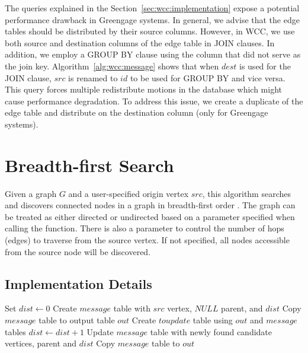 The queries explained in the Section~\ref{sec:wcc:implementation} expose a
potential performance drawback in Greengage systems. In general, we advise
that the edge tables should be distributed by their source columns. However,
in WCC, we use both source and destination columns of the edge table in JOIN
clauses. In addition, we employ a GROUP BY clause using the column that did
not serve as the join key. Algorithm~\ref{alg:wcc:message} shows that when $dest$
is used for the JOIN clause, $src$ is renamed to $id$ to be used for GROUP BY
and vice versa. This query forces multiple redistribute motions in the
database which might cause performance degradation. To address this issue, we
create a duplicate of the edge table and distribute on the destination column
(only for Greengage systems).

\section{Breadth-first Search} \label{sec:graph:bfs}

Given a graph $G$ and a user-specified origin vertex $src$, this algorithm
searches and discovers connected nodes in a graph in breadth-first order
\cite{bfs_wikipedia}. The graph can be treated as either directed or
undirected based on a parameter specified when calling the function.
There is also a parameter to control the number of hops (edges) to traverse
from the source vertex. If not specified, all nodes accessible from the
source node will be discovered.

\subsection{Implementation Details}
\begin{algorithm} \label{alg:bfs:high}
\begin{algorithmic}[1]
    \State Set $dist \leftarrow 0$
    \State Create $message$ table with $src$ vertex, $NULL$ parent, and $dist$
    \State Copy $message$ table to output table $out$
    \Repeat
        \State Create $toupdate$ table using $out$ and $message$ tables
        \State $dist \leftarrow dist + 1$
        \State Update $message$ table with newly found candidate vertices, parent and $dist$
        \State Copy $message$ table to $out$
\end{algorithmic}
\end{algorithm}


